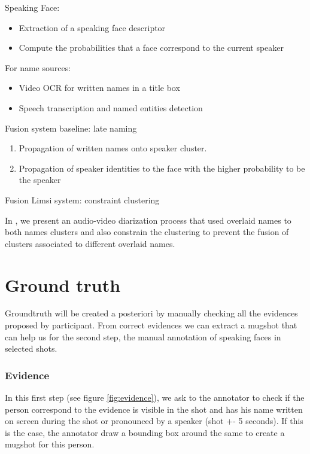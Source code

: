 \documentclass{acm_proc_article-me}
\begin{document}
Speaking Face:
\begin{itemize}
\item Extraction of a speaking face descriptor
\item Compute the probabilities that a face correspond to the current speaker
\end{itemize}

For name sources: 
\begin{itemize}
\item Video OCR for written names in a title box
\item Speech transcription and named entities detection
\end{itemize}

Fusion system baseline: late naming

\begin{enumerate}
\item Propagation of written names onto speaker cluster. 
\item Propagation of speaker identities to the face with the higher probability to be the speaker
\end{enumerate}

Fusion Limsi system: constraint clustering

In \cite{}, we present an audio-video diarization process that used overlaid names to both names clusters and also constrain the clustering to prevent the fusion of clusters associated to different overlaid names.





\section{Ground truth}

Groundtruth will be created a posteriori by manually checking all the evidences proposed by participant. From correct evidences we can extract a mugshot that can help us for the second step, the manual annotation of speaking faces in selected shots.

\subsubsection{Evidence}

In this first step (see figure \ref{fig:evidence}), we ask to the annotator to check if the person correspond to the evidence is visible in the shot and has his name written on screen during the shot or pronounced by a speaker (shot +- 5 seconds). If this is the case, the annotator draw a bounding box around the same to create a mugshot for this person.
\end{document}
